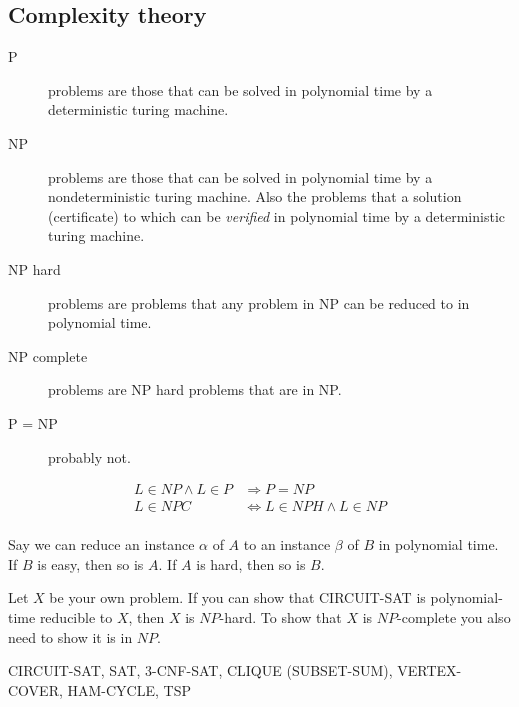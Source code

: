 \documentclass[10pt, a4paper,landscape]{article}
\begin{document}
\begin{multicols*}{4}
\subsection{Complexity theory}
\begin{description}
    \item[P] problems are those that can be solved in polynomial time by a deterministic turing machine.
    \item[NP] problems are those that can be solved in polynomial time by a nondeterministic turing machine.
        Also the problems that a solution (certificate) to which can be \emph{verified} in polynomial time by a deterministic turing machine.
    \item[NP hard] problems are problems that any problem in NP can be reduced to in polynomial time.
    \item[NP complete] problems are NP hard problems that are in NP.
    \item[P = NP] probably not.
\end{description}

\begin{align*}
L \in NP \wedge L \in P &\Rightarrow P = NP\\
L \in NPC &\Leftrightarrow L \in NPH \wedge L \in NP\\
\end{align*}

Say we can reduce an instance $\alpha$ of $A$ to an instance $\beta$ of $B$ in polynomial time. If $B$ is easy, then so is $A$. If $A$ is hard, then so is $B$.

Let $X$ be your own problem. If you can show that CIRCUIT-SAT is polynomial-time reducible to $X$, then $X$ is $NP$-hard. To show that $X$ is $NP$-complete you also need to show it is in $NP$.


CIRCUIT-SAT, SAT, 3-CNF-SAT, CLIQUE (SUBSET-SUM), VERTEX-COVER, HAM-CYCLE, TSP


\end{multicols*}
\end{document}
